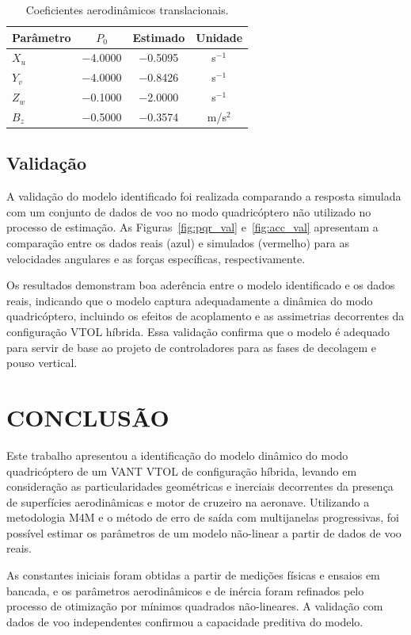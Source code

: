 \documentclass[letterpaper, 10 pt, conference]{ieeeconf}
\begin{document}
\begin{table}[htbp]
\centering
\begin{tabular}{l|c|c|c}
\hline
\textbf{Par\^ametro} & \textbf{$P_0$} & \textbf{Estimado} & \textbf{Unidade} \\
\hline
$X_u$ & $-$4.0000 & $-$0.5095 & s$^{-1}$ \\
$Y_v$ & $-$4.0000 & $-$0.8426 & s$^{-1}$ \\
$Z_w$ & $-$0.1000 & $-$2.0000 & s$^{-1}$ \\
$B_z$ & $-$0.5000 & $-$0.3574 & m/s$^2$ \\
\hline
\end{tabular}
\caption{Coeficientes aerodin\^amicos translacionais.}
\label{tab:param_trans}
\end{table}

\subsection{Validação}
A validação do modelo identificado foi realizada comparando a resposta simulada com um conjunto de dados de voo no modo quadricóptero não utilizado no processo de estimação. As Figuras~\ref{fig:pqr_val} e~\ref{fig:acc_val} apresentam a comparação entre os dados reais (azul) e simulados (vermelho) para as velocidades angulares e as forças específicas, respectivamente.

Os resultados demonstram boa aderência entre o modelo identificado e os dados reais, indicando que o modelo captura adequadamente a dinâmica do modo quadricóptero, incluindo os efeitos de acoplamento e as assimetrias decorrentes da configuração VTOL híbrida. Essa validação confirma que o modelo é adequado para servir de base ao projeto de controladores para as fases de decolagem e pouso vertical.

\section{CONCLUSÃO}

Este trabalho apresentou a identificação do modelo dinâmico do modo quadricóptero de um VANT VTOL de configuração híbrida, levando em consideração as particularidades geométricas e inerciais decorrentes da presença de superfícies aerodinâmicas e motor de cruzeiro na aeronave. Utilizando a metodologia M4M e o método de erro de saída com multijanelas progressivas, foi possível estimar os parâmetros de um modelo não-linear a partir de dados de voo reais.

As constantes iniciais foram obtidas a partir de medições físicas e ensaios em bancada, e os parâmetros aerodinâmicos e de inércia foram refinados pelo processo de otimização por mínimos quadrados não-lineares. A validação com dados de voo independentes confirmou a capacidade preditiva do modelo.
\end{document}
